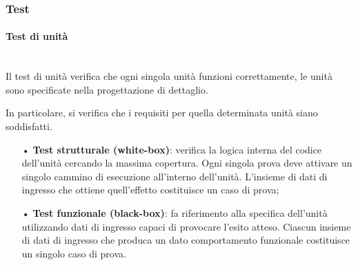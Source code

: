 {\subsubsection{Test}

\paragraph{Test di unità}\mbox{}\\
Il test di unità verifica che ogni singola unità funzioni correttamente, le unità sono specificate nella progettazione di dettaglio.  

In particolare, si verifica che i requisiti per quella determinata unità siano soddisfatti.
\begin{itemize}
\item[•] \textbf{Test strutturale (white-box)}: verifica la logica interna del codice dell’unità cercando la massima copertura. Ogni singola prova deve attivare un singolo cammino di esecuzione all’interno dell’unità. L’insieme di dati di ingresso che ottiene quell’effetto costituisce un caso di prova;
\item[•] \textbf{Test funzionale (black-box)}: fa riferimento alla specifica dell'unità utilizzando dati di ingresso capaci di provocare l'esito atteso. Ciascun insieme di dati di ingresso che produca un dato comportamento funzionale costituisce un singolo caso di prova.
\end{itemize}

}
